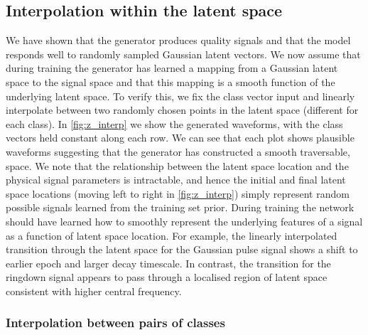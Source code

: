 \documentclass[12pt]{iopart}
\begin{document}
\subsection{Interpolation within the latent space}
%
%
 We have shown that the generator produces quality signals and that the model responds well to randomly sampled Gaussian latent vectors. We now assume that during training the generator has learned a mapping from a Gaussian latent space to the signal space and that this mapping is a smooth function of the underlying latent space. To verify this, we fix the class vector input and linearly interpolate between two randomly chosen points in the latent space (different for each class). In \cref{fig:z_interp} we show the generated waveforms, with the class vectors held constant along each row. We can see that each plot shows plausible waveforms suggesting that the generator has constructed a smooth traversable, space. We note that the relationship between the latent space location and the physical signal parameters is intractable, and hence the initial and final latent space locations (moving left to right in \cref{fig:z_interp}) simply represent random possible signals learned from the training set prior. During training the network should have learned how to smoothly represent the underlying features of a signal as a function of latent space location. For example, the linearly interpolated transition through the latent space for the Gaussian pulse signal shows a shift to earlier epoch and larger decay timescale. In contrast, the transition for the ringdown signal appears to pass through a localised region of latent space consistent with higher central frequency. 
\subsubsection{Interpolation between pairs of classes}
\end{document}
